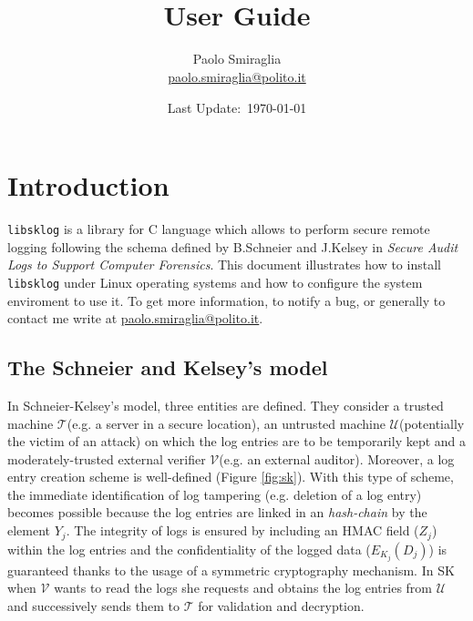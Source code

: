 \documentclass[a4paper,12pt]{article}
\author{Paolo Smiraglia \\ \small{\url{paolo.smiraglia@polito.it}}}
\title{\libsklog \\ User Guide}
\date{Last Update:~\today}
\def\libsklog{\texttt{libsklog}\xspace}
\def\u{$\mathcal{U}$\xspace}
\def\t{$\mathcal{T}$\xspace}
\def\v{$\mathcal{V}$\xspace}
\begin{document}
\maketitle


\section{Introduction}

\libsklog is a library for C language which allows to perform secure
remote logging following the schema defined by B.Schneier and
J.Kelsey in \emph{Secure Audit Logs to Support Computer Forensics}.
This document illustrates how to install \libsklog under Linux
operating systems and how to configure the system enviroment to use it.
To get more information, to notify a bug, or generally to contact me
write at \url{paolo.smiraglia@polito.it}.

\subsection{The Schneier and Kelsey's model}

In Schneier-Kelsey's model, three entities are defined. They
consider a trusted machine \t (e.g. a server in a secure location),
an untrusted machine \u (potentially the victim of an attack) on
which the log entries are to be temporarily kept and a
moderately-trusted external verifier \v (e.g. an external auditor).
Moreover, a log entry creation scheme is well-defined (Figure \ref{fig:sk}).
With this type of scheme, the immediate identification of log
tampering (e.g. deletion of a log entry) becomes possible because
the log entries are linked in an \emph{hash-chain} by the element
$Y_{j}$. The integrity of logs is ensured by including an
HMAC field ($Z_{j}$) within the log entries and the confidentiality of
the logged data ($E_{K_{j}}(D_{j})$) is guaranteed thanks to the
usage of a symmetric cryptography mechanism. In SK when \v wants
to read the logs she requests and obtains the log entries from \u
and successively sends them to \t for validation and decryption.
\end{document}
